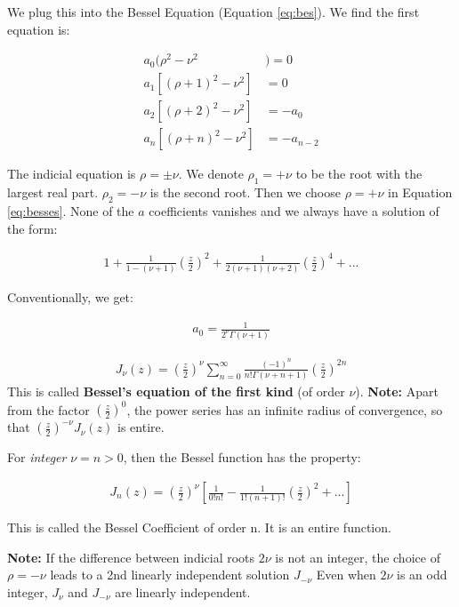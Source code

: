 \documentclass{article}
\theoremstyle{definition}
\newcommand{\eq}[1]{\begin{align*}
	#1
	\end{align*}}
\begin{document}
We plug this into the Bessel Equation (Equation \ref{eq:bes}). We find the first equation is:

\begin{align}\label{eq:besses}
a_0(\rho^2-\nu^2&)=0 \\ 
a_1[(\rho+1)^2-\nu^2] &= 0 \\ 
a_2[(\rho+2)^2-\nu^2] &= -a_0 \\ 
a_n[(\rho+n)^2-\nu^2] &= -a_{n-2}
\end{align}

The indicial equation is $\rho = \pm \nu $. We denote $\rho_1 = +\nu$ to be the root with the largest real part. $\rho_2 = -\nu$ is the second root. Then we choose $\rho = +\nu$ in Equation \ref{eq:besses}.  None of the $a$ coefficients vanishes and we always have a solution of the form:

\eq{1+\frac{1}{1-(\nu+1)} \left(\frac{z}{2}\right)^2 +\frac{1}{2(\nu+1)(\nu+2)}\left(\frac{z}{2}\right)^4+... }


Conventionally, we get:

\begin{align*}
a_0 = \frac{1}{2^\nu \Gamma(\nu+1)}
\end{align*}

\begin{align*}
J_\nu (z) = \left(\frac{z}{2}\right)^\nu \sum_{n=0}^{\infty} \frac{(-1)^n}{n! \Gamma(\nu+n+1)} \left(\frac{z}{2}\right)^{2n}
\end{align*}
This is called \textbf{Bessel's equation of the first kind} (of order $\nu$).
\textbf{Note:} Apart from the factor $\left(\frac{z}{2}\right)^0$, the power series has an infinite radius of convergence, so that $\left(\frac{z}{2}\right)^{-\nu}J_\nu(z)$ is entire.

For \textit{integer} $\nu=n>0$, then the Bessel function has the property:

\begin{align*}
J_n(z) = \left(\frac{z}{2}\right)^\nu \left[\frac{1}{0!n!} - \frac{1}{1!(n+1)!}\left(\frac{z}{2}\right)^{2}+...\right] 
\end{align*}

This is called the Bessel Coefficient of order n. It is an entire function.

\textbf{Note:} If the difference between indicial roots $2\nu$ is not an integer, the choice of $\rho=-\nu$ leads to a 2nd linearly independent solution $J_{-\nu}$ Even when $2\nu$ is an odd integer, $J_\nu$ and $J_{-\nu}$ are linearly independent. 
\end{document}
